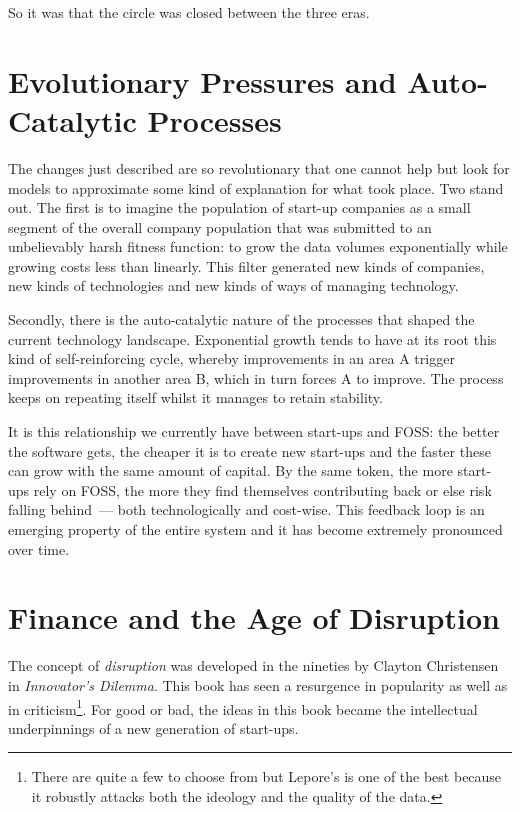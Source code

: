 \documentclass{book}
\begin{document}
So it was that the circle was closed between the three eras.

\section{Evolutionary Pressures and Auto-Catalytic Processes}

The changes just described are so revolutionary that one cannot help
but look for models to approximate some kind of explanation for what
took place. Two stand out. The first is to imagine the population of
start-up companies as a small segment of the overall company
population that was submitted to an unbelievably harsh fitness
function: to grow the data volumes exponentially while growing costs
less than linearly. This filter generated new kinds of companies, new
kinds of technologies and new kinds of ways of managing
technology.

Secondly, there is the auto-catalytic nature of the processes that
shaped the current technology landscape. Exponential growth tends to
have at its root this kind of self-reinforcing cycle, whereby
improvements in an area A trigger improvements in another area B,
which in turn forces A to improve. The process keeps on repeating
itself whilst it manages to retain stability.

It is this relationship we currently have between start-ups and FOSS:
the better the software gets, the cheaper it is to create new
start-ups and the faster these can grow with the same amount of
capital. By the same token, the more start-ups rely on FOSS, the more
they find themselves contributing back or else risk falling behind~---
both technologically and cost-wise. This feedback loop is an emerging
property of the entire system and it has become extremely pronounced
over time.

\section{Finance and the Age of Disruption}

The concept of \emph{disruption} was developed in the nineties by
Clayton Christensen in \emph{Innovator's
  Dilemma}\cite{Christensen01}. This book has seen a resurgence in
popularity as well as in criticism\footnote{There are quite a few to
  choose from but Lepore's \cite{Lepore01} is one of the best because
  it robustly attacks both the ideology and the quality of the
  data.}. For good or bad, the ideas in this book became the
intellectual underpinnings of a new generation of start-ups.
\end{document}
